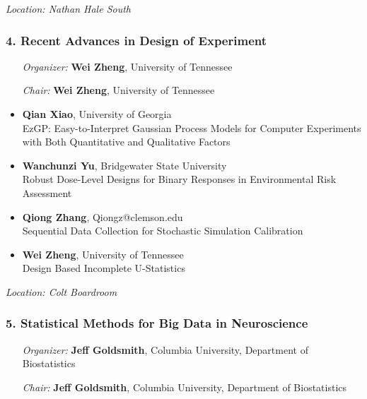 \emph{Location: Nathan Hale South}

\subsubsection*{4. Recent Advances in Design of Experiment}

\begin{enumerate}[align=left]
\item [\emph{Organizer:}] \textbf{Wei Zheng}, University of Tennessee
\item [\emph{Chair:}] \textbf{Wei Zheng}, University of Tennessee
\end{enumerate}

\begin{itemize}
\item \textbf{Qian Xiao}, University of Georgia \\
EzGP: Easy-to-Interpret Gaussian Process Models for Computer Experiments with Both Quantitative and Qualitative Factors
\item \textbf{Wanchunzi Yu}, Bridgewater State University \\
Robust Dose-Level Designs for Binary Responses in Environmental Risk Assessment
\item \textbf{Qiong Zhang}, Qiongz@clemson.edu \\
Sequential Data Collection for Stochastic Simulation Calibration
\item \textbf{Wei Zheng}, University of Tennessee \\
Design Based Incomplete U-Statistics
\end{itemize}

\emph{Location: Colt Boardroom}

\subsubsection*{5. Statistical Methods for Big Data in Neuroscience}

\begin{enumerate}[align=left]
\item [\emph{Organizer:}] \textbf{Jeff Goldsmith}, Columbia University, Department of Biostatistics
\item [\emph{Chair:}] \textbf{Jeff Goldsmith}, Columbia University, Department of Biostatistics
\end{enumerate}

